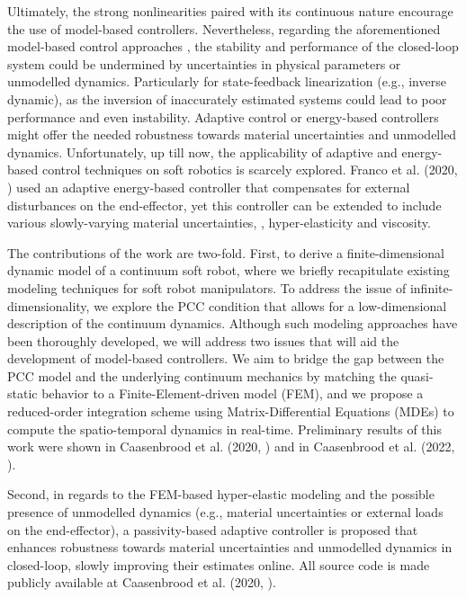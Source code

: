 Ultimately, the strong nonlinearities paired with its continuous nature encourage the use of model-based controllers. Nevertheless, regarding the aforementioned model-based control approaches \cite{DellaSantina2020,Katzschmann2019,Falkenhahn2015}, the stability and performance of the closed-loop system could be undermined by uncertainties in physical parameters or unmodelled dynamics. Particularly for state-feedback linearization (e.g., inverse dynamic), as the inversion of inaccurately estimated systems could lead to poor performance and even instability. Adaptive control \cite{Slotine1988,Morgan1977} or energy-based controllers \cite{Ortega1998} might offer the needed robustness towards material uncertainties and unmodelled dynamics. Unfortunately, up till now, the applicability of adaptive and energy-based control techniques on soft robotics is scarcely explored. Franco et al. (2020, \cite{Franco2020}) used an adaptive energy-based controller that compensates for external disturbances on the end-effector, yet this controller can be extended to include various slowly-varying material uncertainties, \eg, hyper-elasticity and viscosity.

The contributions of the work are two-fold. First, to derive a finite-dimensional dynamic model of a continuum soft robot, where we briefly recapitulate existing modeling techniques for soft robot manipulators. To address the issue of infinite-dimensionality, we explore the PCC condition that allows for a low-dimensional description of the continuum dynamics. Although such modeling approaches have been thoroughly developed, we will address two issues that will aid the development of model-based controllers. We aim to bridge the gap between the PCC model and the underlying continuum mechanics by matching the quasi-static behavior to a Finite-Element-driven model (FEM), and we propose a reduced-order integration scheme using Matrix-Differential Equations (MDEs) to compute the spatio-temporal dynamics in real-time. Preliminary results of this work were shown in Caasenbrood et al. (2020, \cite{Caasenbrood2020}) and in Caasenbrood et al. (2022, \cite{}).
%

Second, in regards to the FEM-based hyper-elastic modeling and the possible presence of unmodelled dynamics (e.g., material uncertainties or external loads on the end-effector), a passivity-based adaptive controller is proposed that enhances robustness towards material uncertainties and unmodelled dynamics in closed-loop, slowly improving their estimates online. All source code is made publicly available at Caasenbrood et al. (2020, \cite{SorotokiCode}).%

